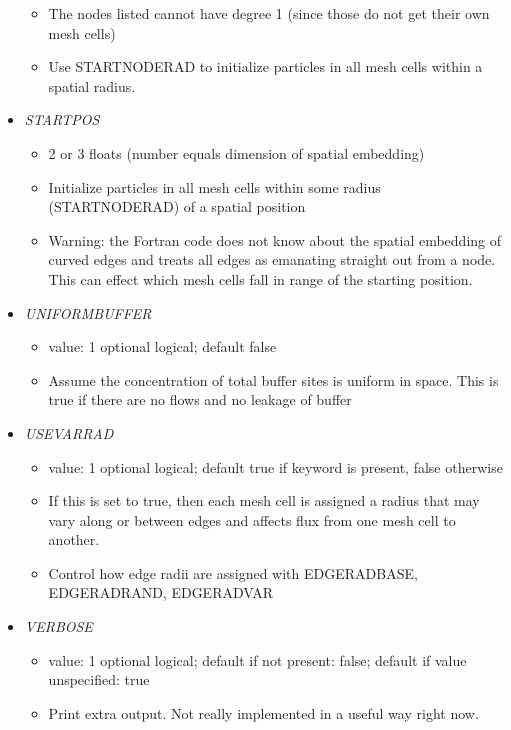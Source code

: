 \documentclass[12pt]{article}
\begin{document}
\begin{itemize}
\begin{itemize}
	\item The nodes listed cannot have degree 1 (since those do not get their own mesh cells)
	\item Use STARTNODERAD to initialize particles in all mesh cells within a spatial radius. 
\end{itemize}
%
\item {\it STARTPOS}
\begin{itemize}
	\item 2 or 3 floats (number equals dimension of spatial embedding)
	\item Initialize particles in all mesh cells within some radius (STARTNODERAD) of a spatial position
	\item {\color{red} Warning:} the Fortran code does not know about the spatial embedding of curved edges and treats all edges as emanating straight out from a node. This can effect which mesh cells fall in range of the starting position.
\end{itemize}
%
\item {\it UNIFORMBUFFER}
\begin{itemize}
	\item  value: 1 optional logical; default false
	\item Assume the concentration of total buffer sites is uniform in space. This is true if there are no flows and  no leakage of buffer
\end{itemize}
%
\item {\it USEVARRAD}
\begin{itemize}
	\item value: 1 optional logical; default true if keyword is present, false otherwise
	\item If this is set to true, then each mesh cell is assigned a radius that may vary along or between edges and affects flux from one mesh cell to another. 
	\item Control how edge radii are assigned with EDGERADBASE, EDGERADRAND, EDGERADVAR
\end{itemize}
%
\item {\it VERBOSE}
        \begin{itemize}
          \item  value: 1 optional logical; default if not present: false; default if value unspecified: true
          \item Print extra output. Not really implemented in a useful way right now.
        \end{itemize}

\end{itemize}

%
%
\end{document}
